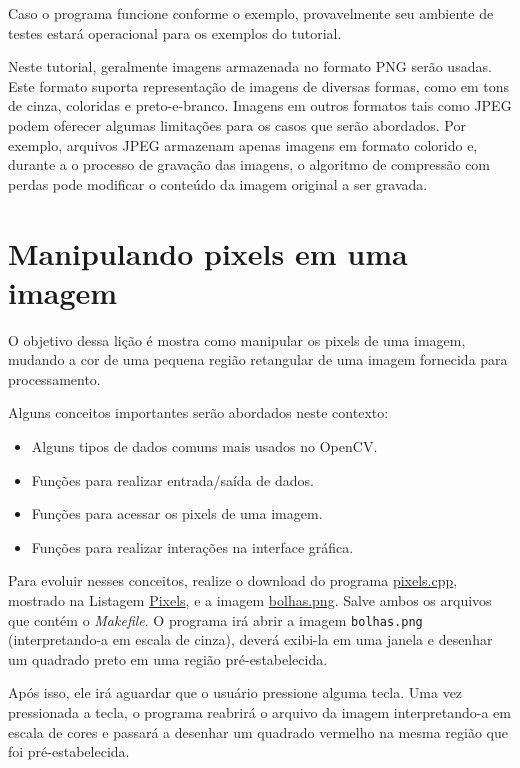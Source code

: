 \documentclass[11pt]{amsbook}
\begin{document}
Caso o programa funcione conforme o exemplo, provavelmente seu
ambiente de testes estará operacional para os exemplos do tutorial.


Neste tutorial, geralmente imagens armazenada no formato PNG serão
usadas. Este formato suporta representação de imagens de diversas
formas, como em tons de cinza, coloridas e preto-e-branco. Imagens em
outros formatos tais como JPEG podem oferecer algumas limitações para
os casos que serão abordados. Por exemplo, arquivos JPEG armazenam
apenas imagens em formato colorido e, durante a o processo de gravação
das imagens, o algoritmo de compressão com perdas pode modificar o
conteúdo da imagem original a ser gravada.


\hypertarget{x-manipulando-pixels-em-uma-imagem}{\chapter{Manipulando pixels em uma imagem}}
O objetivo dessa lição é mostra como manipular os pixels de uma
imagem, mudando a cor de uma pequena região retangular de uma imagem
fornecida para processamento.


Alguns conceitos importantes serão abordados neste contexto:


\begin{itemize}

\item Alguns tipos de dados comuns mais usados no OpenCV.

\item Funções para realizar entrada/saída de dados.

\item Funções para acessar os pixels de uma imagem.

\item Funções para realizar interações na interface gráfica.

\end{itemize}


Para evoluir nesses conceitos, realize o download do programa
\href{exemplos/pixels.cpp}{pixels.cpp}, mostrado na Listagem
\hyperlink{exa-pixels}{Pixels}, e a imagem \href{figs/bolhas.png}{bolhas.png}. Salve
ambos os arquivos que contém o \emph{Makefile}. O programa irá abrir a
imagem \texttt{bolhas.png} (interpretando-a em escala de cinza), deverá
exibi-la em uma janela e desenhar um quadrado preto em uma região
pré-estabelecida.


Após isso, ele irá aguardar que o usuário pressione alguma tecla. Uma
vez pressionada a tecla, o programa reabrirá o arquivo da imagem
interpretando-a em escala de cores e passará a desenhar um quadrado
vermelho na mesma região que foi pré-estabelecida.
\end{document}
